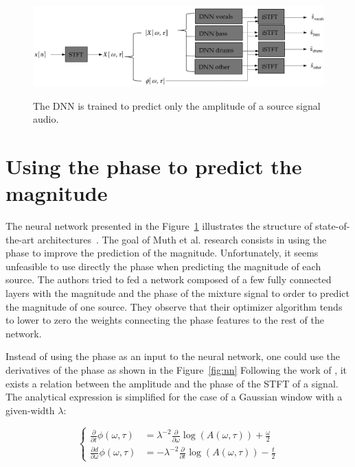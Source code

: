 \begin{figure}
  \centering
  \includegraphics[width=0.9\columnwidth]{mss-amp}
  \label{fig:mss-amp}
  \caption{The DNN is trained to predict only the amplitude of a source signal audio.}
\end{figure}




\section{Using the phase to predict the magnitude}

The neural network presented in the Figure~\ref{fig:mss-amp} illustrates the
structure of state-of-the-art architectures~\cite{chandna2017monoaural}.
The goal of Muth et al. research consists in using the phase to improve the prediction
of the magnitude.
Unfortunately, it seems unfeasible to use directly the phase when predicting
the magnitude of each source. The authors tried to fed a network composed of
a few fully connected layers with the magnitude and the phase of the mixture
signal to order to predict the magnitude of one source. They observe that
their optimizer algorithm tends to lower to zero the weights connecting
the phase features to the rest of the network.

Instead of using the phase as an input to the neural network, one could use
the derivatives of the phase as shown in the Figure~\ref{fig:nn}
Following the work of \cite{auger2012phase}, it exists a relation
between the amplitude and the phase of the STFT of a signal.
The analytical expression is simplified for the case of a Gaussian window with a given-width $\lambda$:

\begin{equation}
    \left\{
        \begin{array}{ll}
            \frac{\partial }{\partial t}\phi(\omega, \tau) &= \lambda^{-2}   \frac{\partial}{\partial \omega} \log(A(\omega, \tau)) + \frac{\omega}{2} \\
            \frac{\partial d}{\partial \omega}\phi(\omega, \tau) &= -\lambda^{-2}   \frac{\partial}{\partial t} \log(A(\omega, \tau)) - \frac{t}{2}
        \end{array}
    \right.
\end{equation}

